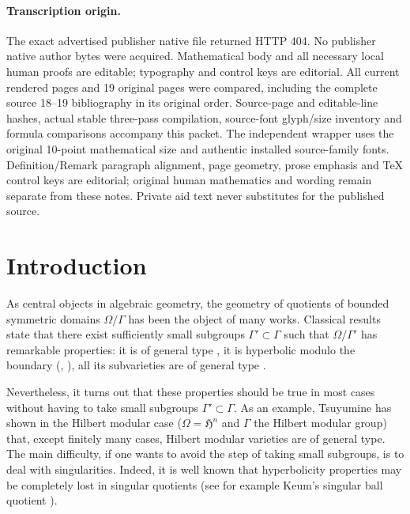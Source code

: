 \documentclass[10pt]{article}
\theoremstyle{definition}
\theoremstyle{remark}
\numberwithin{equation}{theorem}
\begin{document}
\paragraph{Transcription origin.}
The exact advertised publisher native file returned HTTP 404. No publisher native author bytes were acquired. Mathematical body and all necessary local human proofs are editable; typography and control keys are editorial. All current rendered pages and 19 original pages were compared, including the complete source 18--19 bibliography in its original order. Source-page and editable-line hashes, actual stable three-pass compilation, source-font glyph/size inventory and formula comparisons accompany this packet. The independent wrapper uses the original 10-point mathematical size and authentic installed source-family fonts. Definition/Remark paragraph alignment, page geometry, prose emphasis and TeX control keys are editorial; original human mathematics and wording remain separate from these notes. Private aid text never substitutes for the published source.
\clearpage


\section{Introduction}
As central objects in algebraic geometry, the geometry of quotients of bounded symmetric domains $\Omega/\Gamma$ has been the object of many works. Classical results state that there exist sufficiently small subgroups $\Gamma' \subset \Gamma$ such that $\Omega/\Gamma'$ has remarkable properties: it is of general type \cite{pubref23}, it is hyperbolic modulo the boundary (\cite{pubref24}, \cite{pubref26}), all its subvarieties are of general type \cite{pubref05}.


Nevertheless, it turns out that these properties should be true in most cases without having to take small subgroups $\Gamma' \subset \Gamma$. As an example, Tsuyumine \cite{pubref29} has shown in the Hilbert modular case ($\Omega=\mathfrak{H}^n$ and $\Gamma$ the Hilbert modular group) that, except finitely many cases, Hilbert modular varieties are of general type. The main difficulty, if one wants to avoid the step of taking small subgroups, is to deal with singularities. Indeed, it is well known that hyperbolicity properties may be completely lost in singular quotients (see for example Keum's singular ball quotient \cite{pubref18}).
\end{document}
